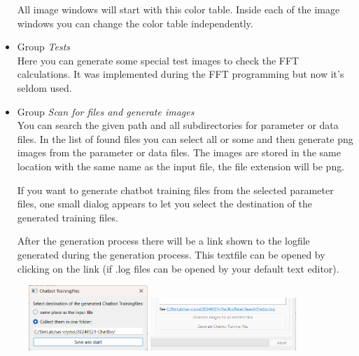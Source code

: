 \documentclass[11pt]{article} %
\begin{document}
\begin{itemize}
	All image windows will start with this color table. Inside each of the image windows you can change the color table independently.
\item Group {\it Tests} \\
	Here you can generate some special test images to check the FFT calculations. It was implemented during the FFT programming but now it's seldom used.
\item Group {\it Scan for files and generate images} \\
	You can search the given path and all subdirectories for parameter or data files. In the list of found files you can select all or some and then generate png images from the parameter or data files. The images are stored in the same location with the same name as the input file, the file extension will be png.
	
If you want to generate chatbot training files from the selected parameter files, one small dialog appears to let you select the destination of the generated training files.
	
After the generation process there will be a link shown to the logfile generated during the generation process. This textfile can be opened by clicking on the link (if .log files can be opened by your default text editor).
\end{itemize}

\begin{figure}
  \begin{center}
	\includegraphics[width=0.40\textwidth]{gui-config-cbtrain.png}  	
	\includegraphics[width=0.49\textwidth]{gui-config-linktext.png}
  \end{center}
\end{figure}
\end{document}
